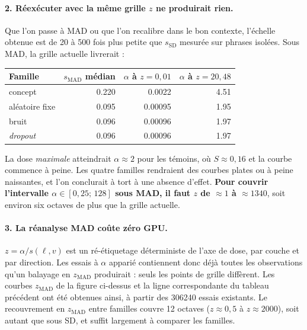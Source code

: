 \documentclass[11pt,a4paper]{article}
\newcommand{\ssd}{s_{\mathrm{SD}}}
\newcommand{\smad}{s_{\mathrm{MAD}}}
\begin{document}
\paragraph{2. Réexécuter avec la même grille $z$ ne produirait rien.} Que l'on passe à
MAD ou que l'on recalibre dans le bon contexte, l'échelle obtenue est de 20 à 500 fois
plus petite que $\ssd$ mesurée sur phrases isolées. Sous MAD, la grille actuelle
livrerait :

\begin{center}
\begin{tabular}{lrrr}
\toprule
Famille & $\smad$ médian & $\alpha$ à $z=0{,}01$ & $\alpha$ à $z=20{,}48$ \\
\midrule
concept          & \num{0.220} & \num{0.0022} & \num{4.51} \\
aléatoire fixe   & \num{0.095} & \num{0.00095} & \num{1.95} \\
bruit            & \num{0.096} & \num{0.00096} & \num{1.97} \\
\emph{dropout}   & \num{0.096} & \num{0.00096} & \num{1.97} \\
\bottomrule
\end{tabular}
\end{center}

\noindent
La dose \emph{maximale} atteindrait $\alpha \approx 2$ pour les témoins, où $S \approx
0{,}16$ et la courbe commence à peine. Les quatre familles rendraient des courbes plates
ou à peine naissantes, et l'on conclurait à tort à une absence d'effet. \textbf{Pour
couvrir l'intervalle $\alpha \in [0{,}25;\,128]$ sous MAD, il faut $z$ de $\approx 1$ à
$\approx 1340$}, soit environ six octaves de plus que la grille actuelle.

\paragraph{3. La réanalyse MAD coûte zéro GPU.} $z = \alpha / s(\ell,v)$ est un
ré-étiquetage déterministe de l'axe de dose, par couche et par direction. Les essais à
$\alpha$ apparié contiennent donc déjà toutes les observations qu'un balayage en
$z_{\mathrm{MAD}}$ produirait : seuls les points de grille diffèrent. Les courbes
$z_{\mathrm{MAD}}$ de la figure ci-dessus et la ligne correspondante du tableau
précédent ont été obtenues ainsi, à partir des \num{306240} essais existants. Le
recouvrement en $z_{\mathrm{MAD}}$ entre familles couvre \num{12} octaves
($z \approx 0{,}5$ à $z \approx 2000$), soit autant que sous SD, et suffit largement à
comparer les familles.
\end{document}
